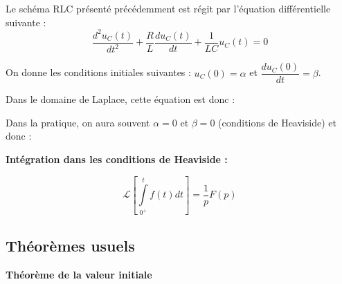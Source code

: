 \documentclass[10pt,fleqn]{article} %
\begin{document}
\begin{exemple}
Le schéma RLC présenté précédemment est régit par l'équation différentielle suivante : 
$$
\dfrac{d^2u_C(t)}{dt^2} +\dfrac{R}{L} \dfrac{du_C(t)}{dt} + \dfrac{1}{LC}u_C(t)=0 
$$ 

On donne les conditions initiales suivantes : $u_C(0)=\alpha$ et $\dfrac{du_C(0)}{dt} = \beta$.

Dans le domaine de Laplace, cette équation est donc : 


Dans la pratique, on aura souvent $\alpha=0$ et $\beta=0$ (conditions de Heaviside) et donc :

\end{exemple}

\textbf{Intégration dans les conditions de Heaviside :}

$$\mathcal{L}\left[ \int\limits_{0^{+}}^t f(t) dt \right] = \dfrac{1}{p} F(p)$$


\subsection{Théorèmes usuels}


\begin{theorem}
\textbf{Théorème de la valeur initiale}

\end{theorem}
\end{document}
